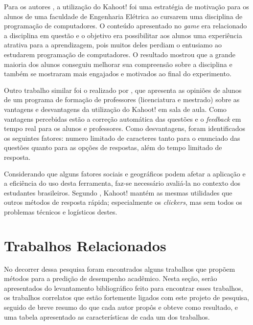 \documentclass[
	12pt,				%
	openright,			%
	oneside,
	a4paper,			%
	english,			%
	french,				%
	spanish,			%
	brazil,				%
	]{abntex2}
\begin{document}
Para os autores , a utilização do Kahoot! foi uma estratégia de motivação para os alunos de uma faculdade de Engenharia Elétrica ao cursarem uma disciplina de programação de computadores. O conteúdo apresentado no \textit{game} era relacionado a disciplina em questão e o objetivo era possibilitar aos alunos uma experiência atrativa para a aprendizagem, pois muitos deles perdiam o entusiamo ao estudarem programação de computadores. O resultado mostrou que a grande maioria dos alunos conseguiu melhorar sua  compreensão sobre a disciplina e também se mostraram mais engajados e motivados ao final do experimento.

Outro trabalho similar foi o realizado por , que apresenta as opiniões de alunos de um programa de formação de professores (licenciatura e mestrado) sobre as vantagens e desvantagens da utilização do Kahoot! em sala de aula. Como vantagens percebidas estão a correção automática das questões e o \textit{feedback} em tempo real para os alunos e professores. Como desvantagens, foram identificados os seguintes fatores: numero limitado de caracteres tanto para o enunciado das questões quanto para as opções de respostas, além do tempo limitado de resposta.

 Considerando que alguns fatores sociais e geográficos podem afetar a aplicação e a eficiência do uso desta ferramenta, faz-se necessário avaliá-la no contexto dos estudantes brasileiros. Segundo , Kahoot! mantém as mesmas utilidades que outros métodos de resposta rápida; especialmente os \textit{clickers}, mas sem todos os problemas técnicos e logísticos destes.



\chapter{Trabalhos Relacionados} \label{sec:TR}
No decorrer dessa pesquisa foram encontrados alguns trabalhos que propõem métodos para a predição de desempenho acadêmico. Nesta seção, serão apresentados do levantamento bibliográfico feito para encontrar esses trabalhos, os trabalhos correlatos que estão fortemente ligados com este projeto de pesquisa, seguido de breve resumo do que cada autor propôs e obteve como resultado, e uma tabela apresentado as  características de cada um dos trabalhos.
\end{document}
